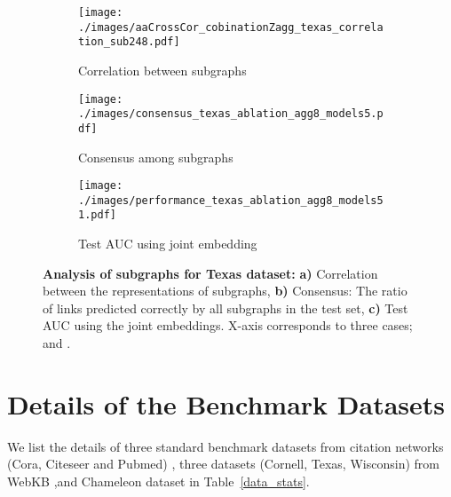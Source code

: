 \documentclass{article}
\begin{document}
\begin{figure}[h]
\vskip 0.2in
\begin{center}
     \begin{subfigure}[c]{0.32\columnwidth}
        \texttt{[image: ./images/aaCrossCor\_cobinationZagg\_texas\_correlation\_sub248.pdf]}
         \caption{Correlation between subgraphs}
     \end{subfigure}
     \begin{subfigure}[c]{0.32\columnwidth}
        \texttt{[image: ./images/consensus\_texas\_ablation\_agg8\_models5.pdf]}
         \caption{Consensus among subgraphs}
     \end{subfigure}
     \begin{subfigure}[c]{0.32\columnwidth}
        \texttt{[image: ./images/performance\_texas\_ablation\_agg8\_models51.pdf]}
         \caption{Test AUC using joint embedding}
     \end{subfigure}
\caption{\textbf{Analysis of subgraphs for Texas dataset:} \textbf{a)} Correlation between the representations of subgraphs,  \textbf{b)} Consensus: The ratio of links predicted correctly by all subgraphs in the test set,  \textbf{c)} Test AUC using the joint embeddings. X-axis corresponds to three cases;  and .}\label{fig:analysis_subgraphs_texas}
\end{center}
\vskip -0.2in
\end{figure}


\section{Details of the Benchmark Datasets}

We list the details of three standard benchmark datasets from citation networks (Cora, Citeseer and Pubmed) \citep{sen2008collective}, three datasets (Cornell, Texas, Wisconsin) from WebKB \citep{pei2020geom},and Chameleon dataset \citep{rozemberczki2021multi} in Table~\ref{data_stats}.
\end{document}
